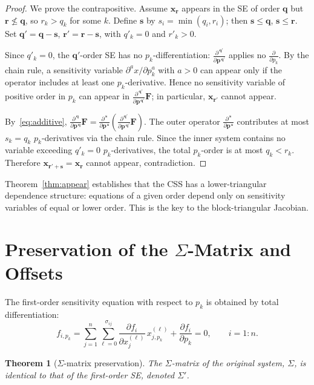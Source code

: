 \documentclass[12pt,a4paper]{article}
\theoremstyle{definition}
\theoremstyle{plain}
\newtheorem{theorem}{Theorem}[section]
\theoremstyle{remark}
\newcommand{\vx}{\mathbf{x}}
\newcommand{\vp}{\mathbf{p}}
\newcommand{\vq}{\mathbf{q}}
\newcommand{\vr}{\mathbf{r}}
\newcommand{\vs}{\mathbf{s}}
\newcommand{\vF}{\mathbf{F}}
\newcommand{\D}[2]{\frac{\partial^{\,#2}}{\partial #1^{\,#2}}}
\begin{document}
\begin{proof}
We prove the contrapositive. Assume $\vx_\vr$ appears in the SE of order $\vq$ but $\vr \nleq \vq$, so $r_k > q_k$ for some $k$. Define $\vs$ by $s_i = \min(q_i, r_i)$; then $\vs \leq \vq$, $\vs \leq \vr$. Set $\vq' = \vq - \vs$, $\vr' = \vr - \vs$, with $q'_k = 0$ and $r'_k > 0$.

Since $q'_k = 0$, the $\vq'$-order SE has no $p_k$-differentiation: $\D{\vp}{\vq'}$ applies no $\frac{\partial}{\partial p_k}$. By the chain rule, a sensitivity variable $\partial^{a}x/\partial p_k^{a}$ with $a>0$ can appear only if the operator includes at least one $p_k$-derivative. Hence no sensitivity variable of positive order in $p_k$ can appear in $\D{\vp}{\vq'}\vF$; in particular, $\vx_{\vr'}$ cannot appear.

By~\eqref{eq:additive}, $\D{\vp}{\vq}\vF = \D{\vp}{\vs}(\D{\vp}{\vq'}\vF)$. The outer operator $\D{\vp}{\vs}$ contributes at most $s_k = q_k$ $p_k$-derivatives via the chain rule. Since the inner system contains no variable exceeding $q'_k=0$ $p_k$-derivatives, the total $p_k$-order is at most $q_k < r_k$. Therefore $\vx_{\vr'+\vs} = \vx_\vr$ cannot appear, contradiction.
\end{proof}

Theorem~\ref{thm:appear} establishes that the CSS has a lower-triangular dependence structure: equations of a given order depend only on sensitivity variables of equal or lower order. This is the key to the block-triangular Jacobian.

\section{Preservation of the $\Sigma$-Matrix and Offsets}

The first-order sensitivity equation with respect to $p_k$ is obtained by total differentiation:
\begin{equation}\label{eq:first_order_SE}
  f_{i,p_k} = \sum_{j=1}^n \sum_{\ell=0}^{\sigma_{ij}}
    \frac{\partial f_i}{\partial x_j^{(\ell)}}\, x_{j,p_k}^{(\ell)}
    + \frac{\partial f_i}{\partial p_k}
    = 0,\qquad i=1:n.
\end{equation}

\begin{theorem}[$\Sigma$-matrix preservation]
\label{thm:same_sigma}
The $\Sigma$-matrix of the original system, $\Sigma$, is identical to that of the first-order SE, denoted $\Sigma'$.
\end{theorem}
\end{document}
